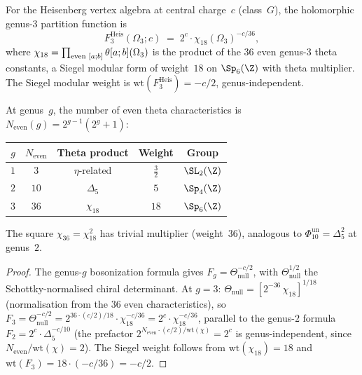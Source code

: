 \begin{proposition}
\label{prop:genus3-heisenberg}
For the Heisenberg vertex algebra at central charge~$c$ \textup{(}class~$G$\textup{)},
the holomorphic genus-$3$ partition function is
\[
 F_3^{\mathrm{Heis}}(\Omega_3; c)
 \;=\;
 2^c \cdot \chi_{18}(\Omega_3)^{-c/36},
\]
where $\chi_{18} = \prod_{\textup{even } [a;b]} \theta[a;b](\Omega_3)$
is the product of the $36$ even genus-$3$ theta constants, a Siegel
modular form of weight~$18$ on $\Sp_6(\Z)$ with theta multiplier.
The Siegel modular weight is $\mathrm{wt}(F_3^{\mathrm{Heis}}) = -c/2$,
genus-independent.

At genus~$g$, the number of even theta characteristics is
$N_{\mathrm{even}}(g) = 2^{g-1}(2^g + 1)$:
\begin{center}
\renewcommand{\arraystretch}{1.2}
\begin{tabular}{ccccc}
 \toprule
 $g$ & $N_{\mathrm{even}}$ & Theta product & Weight & Group \\
 \midrule
 $1$ & $3$ & $\eta$-related & $\frac{3}{2}$ & $\SL_2(\Z)$ \\
 $2$ & $10$ & $\Delta_5$ & $5$ & $\Sp_4(\Z)$ \\
 $3$ & $36$ & $\chi_{18}$ & $18$ & $\Sp_6(\Z)$ \\
 \bottomrule
\end{tabular}
\end{center}
The square $\chi_{36} = \chi_{18}^2$ has trivial multiplier \textup{(}weight~$36$\textup{)},
analogous to $\Phi_{10}^{\mathrm{un}} = \Delta_5^2$ at genus~$2$.
\end{proposition}

\begin{proof}
The genus-$g$ bosonization formula gives
$F_g = \Theta_{\mathrm{null}}^{-c/2}$, with
$\Theta_{\mathrm{null}}^{1/2}$ the Schottky-normalised chiral determinant.
At $g = 3$: $\Theta_{\mathrm{null}} = [2^{-36}\,\chi_{18}]^{1/18}$
(normalisation from the $36$ even characteristics), so
$F_3 = \Theta_{\mathrm{null}}^{-c/2}
 = 2^{36 \cdot (c/2)/18} \cdot \chi_{18}^{-c/36}
 = 2^c \cdot \chi_{18}^{-c/36}$,
parallel to the genus-$2$ formula
$F_2 = 2^c \cdot \Delta_5^{-c/10}$ (the prefactor
$2^{N_{\mathrm{even}} \cdot (c/2)/\mathrm{wt}(\chi)} = 2^c$ is
genus-independent, since $N_{\mathrm{even}}/\mathrm{wt}(\chi) = 2$).
The Siegel weight follows from
$\mathrm{wt}(\chi_{18}) = 18$ and $\mathrm{wt}(F_3) = 18 \cdot (-c/36) = -c/2$.
\end{proof}

